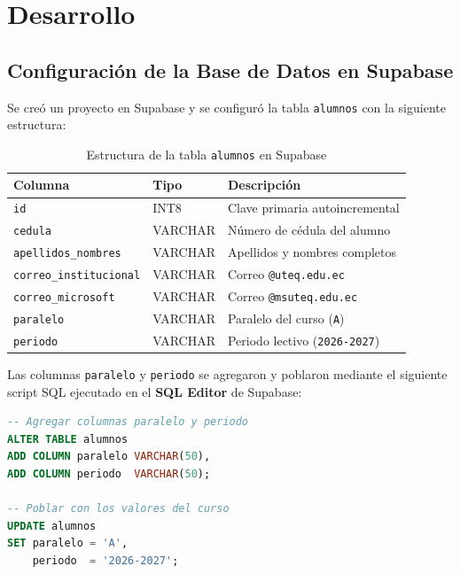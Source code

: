 \documentclass[12pt]{article}
\begin{document}
\section{Desarrollo}

\subsection{Configuración de la Base de Datos en Supabase}

Se creó un proyecto en Supabase y se configuró la tabla \texttt{alumnos} con la siguiente estructura:

\begin{table}[H]
\centering
\caption{Estructura de la tabla \texttt{alumnos} en Supabase}
\begin{tabular}{@{}lll@{}}
\toprule
\textbf{Columna} & \textbf{Tipo} & \textbf{Descripción} \\
\midrule
\texttt{id}                   & INT8    & Clave primaria autoincremental \\
\texttt{cedula}               & VARCHAR & Número de cédula del alumno \\
\texttt{apellidos\_nombres}   & VARCHAR & Apellidos y nombres completos \\
\texttt{correo\_institucional}& VARCHAR & Correo \texttt{@uteq.edu.ec} \\
\texttt{correo\_microsoft}    & VARCHAR & Correo \texttt{@msuteq.edu.ec} \\
\texttt{paralelo}             & VARCHAR & Paralelo del curso (\texttt{A}) \\
\texttt{periodo}              & VARCHAR & Periodo lectivo (\texttt{2026-2027}) \\
\bottomrule
\end{tabular}
\end{table}

Las columnas \texttt{paralelo} y \texttt{periodo} se agregaron y poblaron mediante el siguiente script SQL ejecutado en el \textbf{SQL Editor} de Supabase:

\begin{lstlisting}[language=SQL, caption={Script SQL para agregar columnas y poblar datos}]
-- Agregar columnas paralelo y periodo
ALTER TABLE alumnos
ADD COLUMN paralelo VARCHAR(50),
ADD COLUMN periodo  VARCHAR(50);

-- Poblar con los valores del curso
UPDATE alumnos
SET paralelo = 'A',
    periodo  = '2026-2027';
\end{lstlisting}
\end{document}
